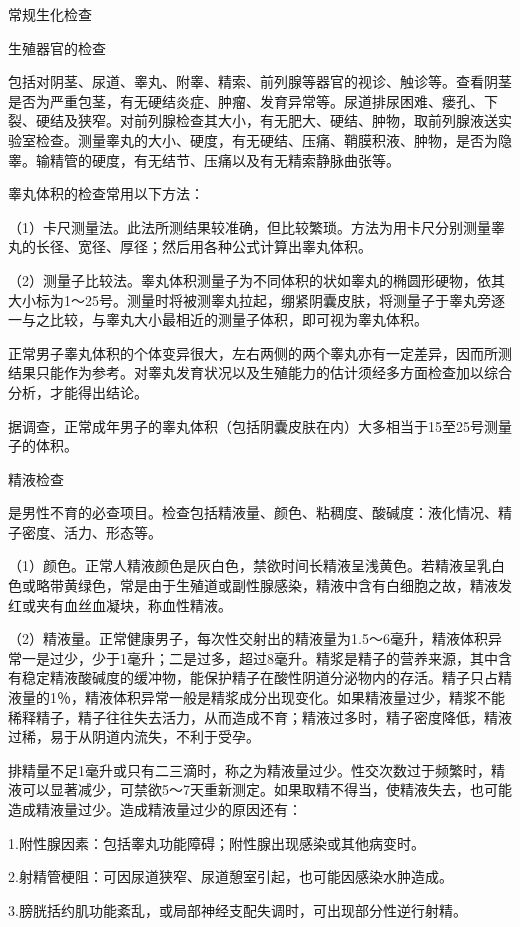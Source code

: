 \documentclass[12pt,UTF8,openany]{ctexbook}
\begin{document}
常规生化检查


生殖器官的检查

包括对阴茎、尿道、睾丸、附睾、精索、前列腺等器官的视诊、触诊等。查看阴茎是否为严重包茎，有无硬结炎症、肿瘤、发育异常等。尿道排尿困难、瘘孔、下裂、硬结及狭窄。对前列腺检查其大小，有无肥大、硬结、肿物，取前列腺液送实验室检查。测量睾丸的大小、硬度，有无硬结、压痛、鞘膜积液、肿物，是否为隐睾。输精管的硬度，有无结节、压痛以及有无精索静脉曲张等。

睾丸体积的检查常用以下方法：

（1）卡尺测量法。此法所测结果较准确，但比较繁琐。方法为用卡尺分别测量睾丸的长径、宽径、厚径；然后用各种公式计算出睾丸体积。

（2）测量子比较法。睾丸体积测量子为不同体积的状如睾丸的椭圆形硬物，依其大小标为1～25号。测量时将被测睾丸拉起，绷紧阴囊皮肤，将测量子于睾丸旁逐一与之比较，与睾丸大小最相近的测量子体积，即可视为睾丸体积。

正常男子睾丸体积的个体变异很大，左右两侧的两个睾丸亦有一定差异，因而所测结果只能作为参考。对睾丸发育状况以及生殖能力的估计须经多方面检查加以综合分析，才能得出结论。

据调查，正常成年男子的睾丸体积（包括阴囊皮肤在内）大多相当于15至25号测量子的体积。

精液检查

是男性不育的必查项目。检查包括精液量、颜色、粘稠度、酸碱度：液化情况、精子密度、活力、形态等。

（1）颜色。正常人精液颜色是灰白色，禁欲时间长精液呈浅黄色。若精液呈乳白色或略带黄绿色，常是由于生殖道或副性腺感染，精液中含有白细胞之故，精液发红或夹有血丝血凝块，称血性精液。

（2）精液量。正常健康男子，每次性交射出的精液量为1.5～6毫升，精液体积异常一是过少，少于1毫升；二是过多，超过8毫升。精浆是精子的营养来源，其中含有稳定精液酸碱度的缓冲物，能保护精子在酸性阴道分泌物内的存活。精子只占精液量的1％，精液体积异常一般是精浆成分出现变化。如果精液量过少，精浆不能稀释精子，精子往往失去活力，从而造成不育；精液过多时，精子密度降低，精液过稀，易于从阴道内流失，不利于受孕。

排精量不足1毫升或只有二三滴时，称之为精液量过少。性交次数过于频繁时，精液可以显著减少，可禁欲5～7天重新测定。如果取精不得当，使精液失去，也可能造成精液量过少。造成精液量过少的原因还有：

1.附性腺因素：包括睾丸功能障碍；附性腺出现感染或其他病变时。

2.射精管梗阻：可因尿道狭窄、尿道憩室引起，也可能因感染水肿造成。

3.膀胱括约肌功能紊乱，或局部神经支配失调时，可出现部分性逆行射精。
\end{document}
